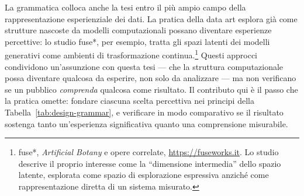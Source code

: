 La grammatica colloca anche la tesi entro il più ampio campo della rappresentazione esperienziale dei dati. La pratica della data art esplora già come strutture nascoste da modelli computazionali possano diventare esperienze percettive: lo studio fuse*, per esempio, tratta gli spazi latenti dei modelli generativi come ambienti di trasformazione continua.\footnote{fuse*, \emph{Artificial Botany} e opere correlate, \url{https://fuseworks.it}. Lo studio descrive il proprio interesse come la ``dimensione intermedia'' dello spazio latente, esplorata come spazio di esplorazione espressiva anziché come rappresentazione diretta di un sistema misurato.} Questi approcci condividono un'assunzione con questa tesi --- che la struttura computazionale possa diventare qualcosa da esperire, non solo da analizzare --- ma non verificano se un pubblico \emph{comprenda} qualcosa come risultato. Il contributo qui è il passo che la pratica omette: fondare ciascuna scelta percettiva nei principi della Tabella~\ref{tab:design-grammar}, e verificare in modo comparativo se il risultato sostenga tanto un'esperienza significativa quanto una comprensione misurabile.



